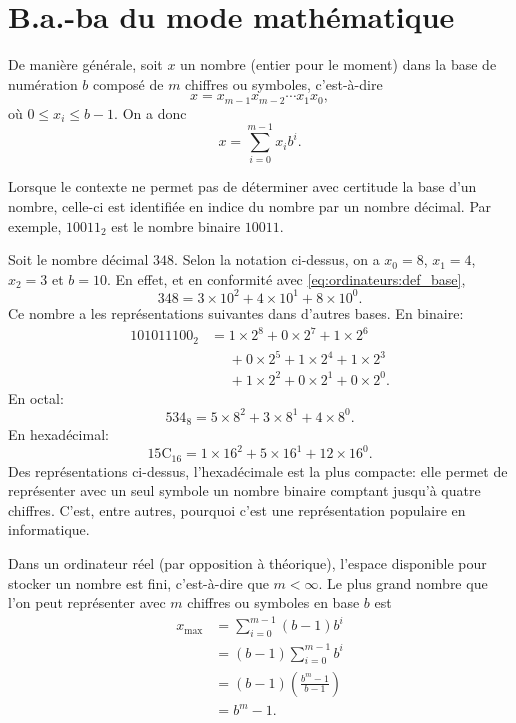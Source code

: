 \chapter{B.a.-ba du mode mathématique}

De manière générale, soit $x$ un nombre (entier pour le moment) dans
la base de numération $b$ composé de $m$ chiffres ou symboles, c'est-à-dire
\begin{equation*}
  x = x_{m-1}x_{m-2} \cdots x_1x_0,
\end{equation*}
où $0 \leq x_i \leq b - 1$. On a donc
\begin{equation}
  \label{eq:ordinateurs:def_base}
  x = \sum_{i = 0}^{m - 1} x_i b^i.
\end{equation}

Lorsque le contexte ne permet pas de déterminer avec certitude la base
d'un nombre, celle-ci est identifiée en indice du nombre par un nombre
décimal. Par exemple, $10011_2$ est le nombre binaire $10011$.

Soit le nombre décimal $348$. Selon la notation ci-dessus, on a $x_0 =
8$, $x_1 = 4$, $x_2 = 3$ et $b = 10$. En effet, et en conformité avec
\eqref{eq:ordinateurs:def_base},
\begin{displaymath}
  348 = 3 \times 10^2 + 4 \times 10^1 + 8 \times 10^0.
\end{displaymath}
Ce nombre a les représentations suivantes dans d'autres bases. En binaire:
\begin{align*}
  101011100_{2}
  &= 1 \times 2^8 + 0 \times 2^7 + 1 \times 2^6 \\
  &\phantom{=} + 0 \times 2^5 + 1 \times 2^4 + 1 \times 2^3 \\
  &\phantom{=} + 1 \times 2^2 + 0 \times 2^1 + 0 \times 2^0.
\end{align*}
En octal:
\begin{equation*}
  534_{8} = 5 \times 8^2 + 3 \times 8^1 + 4 \times 8^0.
\end{equation*}
En hexadécimal:
\begin{equation*}
  15\mathrm{C}_{16} = 1 \times 16^2 + 5 \times 16^1 + 12 \times 16^0.
\end{equation*}
Des représentations ci-dessus, l'hexadécimale est la plus compacte:
elle permet de représenter avec un seul symbole un nombre binaire
comptant jusqu'à quatre chiffres. C'est, entre autres, pourquoi
c'est une représentation populaire en informatique.%

Dans un ordinateur réel (par opposition à théorique), l'espace
disponible pour stocker un nombre est fini, c'est-à-dire que $m <
\infty$. Le plus grand nombre que l'on peut représenter avec $m$
chiffres ou symboles en base $b$ est
\begin{align*}
  x_{\text{max}}
  &= \sum_{i = 0}^{m - 1} (b - 1) b^i \\
  &= (b - 1) \sum_{i = 0}^{m - 1} b^i \\
  &= (b - 1)
  \left(
    \frac{b^m - 1}{b - 1}
  \right) \\
  &= b^m - 1.
\end{align*}
